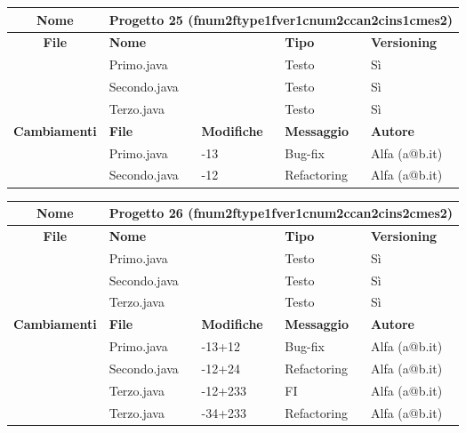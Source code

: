 \begin{table}[ht]
\footnotesize
\begin{tabular}{|c|p{2.5cm}|p{2cm}|p{2.5cm}|p{2.5cm}|}
  \hline
  \textbf{Nome}	& \multicolumn{4}{l|}{Progetto 25 (fnum2ftype1fver1cnum2ccan2cins1cmes2)} 								\\
  \hline
  \rowcolor{lightgray}\textbf{File} 		& \multicolumn{2}{l|}{\textbf{Nome}}		& \textbf{Tipo}		& \textbf{Versioning} 		\\
						\cline{2-5}
						& \multicolumn{2}{l|}{Primo.java}		& Testo			& Sì				\\
						\cline{2-5}
						& \multicolumn{2}{l|}{Secondo.java}		& Testo			& Sì				\\
						\cline{2-5}
						& \multicolumn{2}{l|}{Terzo.java}		& Testo			& Sì				\\
  \hline
  \rowcolor{lightgray}\textbf{Cambiamenti}	& \textbf{File}		&\textbf{Modifiche}	& \textbf{Messaggio}	& \textbf{Autore}		\\
						\cline{2-5}
						& Primo.java		& -13	 		& Bug-fix		& Alfa (a@b.it)			\\
						\cline{2-5}
						& Secondo.java		& -12	 		& Refactoring		& Alfa (a@b.it)			\\
						\cline{2-5}
  \hline
\end{tabular}
\end{table}

\begin{table}[ht]
\footnotesize
\begin{tabular}{|c|p{2.5cm}|p{2cm}|p{2.5cm}|p{2.5cm}|}
  \hline
  \textbf{Nome}	& \multicolumn{4}{l|}{Progetto 26 (fnum2ftype1fver1cnum2ccan2cins2cmes2)} 								\\
  \hline
 \rowcolor{lightgray}\textbf{File} 		& \multicolumn{2}{l|}{\textbf{Nome}}		& \textbf{Tipo}		& \textbf{Versioning} 		\\
						\cline{2-5}
						& \multicolumn{2}{l|}{Primo.java}		& Testo			& Sì				\\
						\cline{2-5}
						& \multicolumn{2}{l|}{Secondo.java}		& Testo			& Sì				\\
						\cline{2-5}
						& \multicolumn{2}{l|}{Terzo.java}		& Testo			& Sì				\\
  \hline
  \rowcolor{lightgray}\textbf{Cambiamenti}	& \textbf{File}		&\textbf{Modifiche}	& \textbf{Messaggio}	& \textbf{Autore}		\\
						\cline{2-5}
						& Primo.java		& -13+12	 	& Bug-fix		& Alfa (a@b.it)			\\
						\cline{2-5}
						& Secondo.java		& -12+24	 	& Refactoring		& Alfa (a@b.it)			\\
						\cline{2-5}
						& Terzo.java		& -12+233	 	& FI			& Alfa (a@b.it)			\\
						\cline{2-5}
						& Terzo.java		& -34+233	 	& Refactoring		& Alfa (a@b.it)			\\
						\cline{2-5}
  \hline
\end{tabular}
\end{table}


